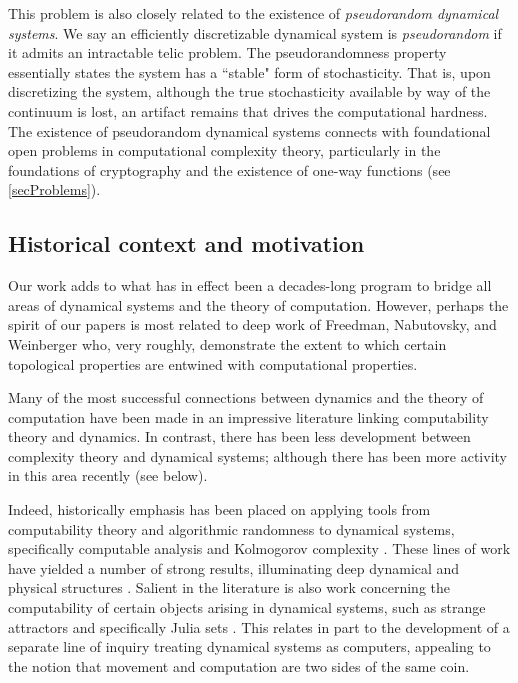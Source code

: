 \documentclass{amsart}
\theoremstyle{theorem}
\theoremstyle{remark}
\numberwithin{equation}{section}
\begin{document}
This problem is also closely related to the existence of \emph{pseudorandom dynamical systems}. We say an efficiently discretizable dynamical system is \emph{pseudorandom} if it admits an intractable telic problem.
The pseudorandomness property essentially states the system has a ``stable" form of stochasticity. That is, upon discretizing the system, although the true stochasticity available by way of the continuum is lost, an artifact remains that 
drives the computational hardness.
The existence of pseudorandom dynamical systems connects with foundational open problems in computational complexity theory, particularly in the foundations of cryptography and the existence of one-way functions (see \cref{secProblems}).



\subsection{Historical context and motivation}\label{secBackground}

Our work adds to what has in effect been a decades-long program to bridge all areas of dynamical systems and the theory of computation.
However, perhaps the spirit of our papers is most related to deep work of Freedman, Nabutovsky, and Weinberger \cite{freedman1998topological,freedman2009complexity,weinberger2020computers,nabutovsky1996algorithmic}
who, very roughly, demonstrate the extent to which certain topological properties are entwined with computational properties.

Many of the most successful connections between dynamics and the theory of computation have been made in an impressive literature linking computability theory and dynamics.
In contrast, there has been less development between complexity theory and dynamical systems; although there has been more activity in this area recently (see below).

Indeed, historically emphasis has been placed on applying tools from computability theory and algorithmic randomness to dynamical systems, specifically computable analysis \cite{weihrauch2012computable} and Kolmogorov complexity \cite{li2008introduction}.
These lines of work have yielded a number of strong results, illuminating deep dynamical and physical structures \cite{crisanti1994applying,hiura2019microscopic,da1991undecidability,da1994undecidable,zurek1989algorithmic,braverman2015space, kreinovich2006towards,bennett1982thermodynamics}.
Salient in the literature is also work concerning the computability of certain objects arising in dynamical systems, such as strange attractors and specifically Julia sets \cite{gracca2018computing,braverman2009constructing,braverman2006non,braverman2009computability,rojas2019computational,bournez2017polynomial,gracca2024robust}.
This relates in part to the development of a separate line of inquiry treating dynamical systems as computers, appealing to the notion that movement and computation are two sides of the same coin.
\end{document}
